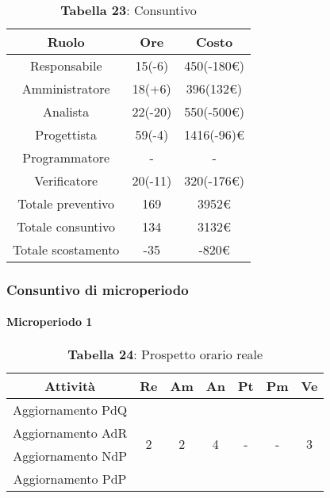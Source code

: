 \begin{table}[H]
	\centering
	\renewcommand{\arraystretch}{1.5}
	\begin{tabular}{|c|c|c|}
		\hline
		\rowcolor{lighter-grayer}
		Ruolo & Ore & Costo \\ \hline
		Responsabile & 15(-6) & 450(-180\euro) \\ \hline
		Amministratore & 18(+6) & 396(132\euro) \\ \hline
		Analista & 22(-20) & 550(-500\euro) \\ \hline
		Progettista & 59(-4) & 1416(-96)\euro \\ \hline
		Programmatore & - & - \\ \hline
		Verificatore & 20(-11) & 320(-176\euro) \\ \hline
		Totale preventivo & 169 & 3952\euro \\ \hline
		Totale consuntivo & 134 & 3132\euro \\ \hline
		Totale scostamento & -35 & -820\euro \\ \hline
	\end{tabular}
	\caption*{\textbf{Tabella 23}: Consuntivo\\}
\end{table}


\subsubsection{Consuntivo di microperiodo}
\paragraph{Microperiodo 1}
\begin{table}[H]
	\centering
	\begin{tabular}{|c|c|c|c|c|c|c|}
		\hline
		\rowcolor{lighter-grayer}
		\textbf{Attività} & \textbf{Re}        & \textbf{Am}        & \textbf{An}        & \textbf{Pt}        & \textbf{Pm}        & \textbf{Ve}        \\ \hline
		Aggiornamento PdQ & \multirow{4}{*}{2} & \multirow{4}{*}{2} & \multirow{4}{*}{4} & \multirow{4}{*}{-} & \multirow{4}{*}{-} & \multirow{4}{*}{3} \\ \cline{1-1}
		Aggiornamento AdR &                    &                    &                    &                    &                    &                    \\ \cline{1-1}
		Aggiornamento NdP &                    &                    &                    &                    &                    &                    \\ \cline{1-1}
		Aggiornamento PdP &                    &                    &                    &                    &                    &                    \\ \hline
	\end{tabular}
	\caption*{\textbf{Tabella 24}: Prospetto orario reale\\}
\end{table}

